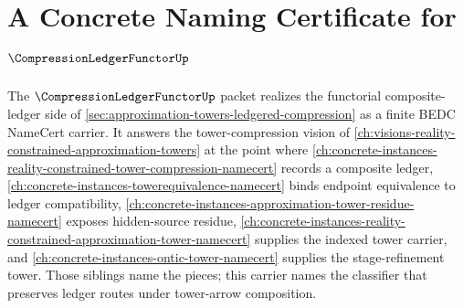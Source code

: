\chapter{A Concrete Naming Certificate for $\CompressionLedgerFunctorUp$}
\label{ch:concrete-instances-compression-ledger-functor-namecert}

The $\CompressionLedgerFunctorUp$ packet realizes the functorial composite-ledger side of \autoref{sec:approximation-towers-ledgered-compression} as a finite BEDC NameCert carrier. It answers the tower-compression vision of \autoref{ch:visions-reality-constrained-approximation-towers} at the point where \autoref{ch:concrete-instances-reality-constrained-tower-compression-namecert} records a composite ledger, \autoref{ch:concrete-instances-towerequivalence-namecert} binds endpoint equivalence to ledger compatibility, \autoref{ch:concrete-instances-approximation-tower-residue-namecert} exposes hidden-source residue, \autoref{ch:concrete-instances-reality-constrained-approximation-tower-namecert} supplies the indexed tower carrier, and \autoref{ch:concrete-instances-ontic-tower-namecert} supplies the stage-refinement tower. Those siblings name the pieces; this carrier names the classifier that preserves ledger routes under tower-arrow composition.

